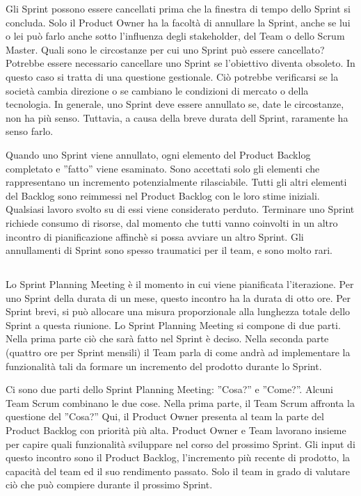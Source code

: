 Gli Sprint possono essere cancellati prima che la finestra di tempo dello Sprint si concluda. Solo il Product Owner ha
la facolt\`a di annullare la Sprint, anche se lui o lei pu\`o farlo anche sotto l'influenza degli stakeholder, del Team
o dello Scrum Master. Quali sono le circostanze per cui uno Sprint pu\`o essere cancellato? Potrebbe essere necessario
cancellare uno Sprint se l'obiettivo diventa obsoleto. In questo caso si tratta di una questione gestionale. Ci\`o
potrebbe verificarsi se la societ\`a cambia direzione o se cambiano le condizioni di mercato o della tecnologia. In
generale, uno Sprint deve essere annullato se, date le circostanze, non ha pi\`u senso. Tuttavia, a causa della breve
durata dell Sprint, raramente ha senso farlo.
\newline

Quando uno Sprint viene annullato, ogni elemento del Product Backlog completato e ''fatto'' viene esaminato. Sono
accettati solo gli elementi che rappresentano un incremento potenzialmente rilasciabile. Tutti gli altri elementi del Backlog
sono reimmessi nel Product Backlog con le loro stime iniziali. Qualsiasi lavoro svolto su di essi viene considerato
perduto. Terminare uno Sprint richiede consumo di risorse, dal momento che tutti vanno coinvolti in un altro incontro di
pianificazione affinch\`e si possa avviare un altro Sprint. Gli annullamenti di Sprint sono spesso traumatici per il
team, e sono molto rari.

\subsection*{\color{Blue}{SPRINT PLANNING MEETING}}
\label{sec:sprintplannnigmeeting}
Lo Sprint Planning Meeting \`e il momento in cui viene pianificata l'iterazione. Per uno Sprint della durata di un mese, questo
incontro ha la durata di otto ore. Per Sprint brevi, si pu\`o allocare una misura proporzionale alla lunghezza totale dello Sprint a questa
riunione. Lo Sprint Planning Meeting si compone di due parti. Nella prima parte ci\`o che sar\`a fatto nel
Sprint \`e deciso. Nella seconda parte (quattro ore per Sprint mensili)  il Team parla di come andr\`a ad implementare
la funzionalit\`a tali da formare un incremento del prodotto durante lo Sprint.
\newline

Ci sono due parti dello Sprint Planning Meeting: ''Cosa?'' e ''Come?''. Alcuni Team Scrum combinano le due cose. Nella
prima parte, il Team Scrum affronta la questione del ''Cosa?'' Qui, il Product Owner presenta al team la parte del Product
Backlog con priorit\`a pi\`u alta. Product Owner e Team lavorano insieme per capire quali funzionalit\`a sviluppare nel corso del prossimo Sprint.
Gli input di questo incontro sono il Product Backlog, l'incremento pi\`u recente di prodotto, la capacit\`a del team ed
il suo rendimento passato. Solo il team in grado di valutare ci\`o che pu\`o compiere durante il prossimo Sprint.
\newline

